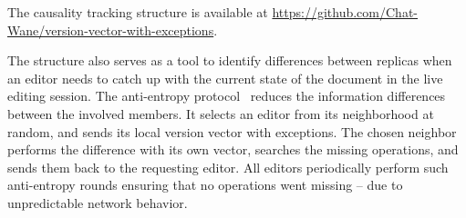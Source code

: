 The causality tracking structure is available at
\url{https://github.com/Chat-Wane/version-vector-with-exceptions}.

The structure also serves as a tool to identify differences between replicas
when an editor needs to catch up with the current state of the document in the
live editing session. The anti-entropy protocol~\cite{demers1987epidemic}
reduces the information differences between the involved members. It selects an
editor from its neighborhood at random, and sends its local version vector with
exceptions. The chosen neighbor performs the difference with its own vector,
searches the missing operations, and sends them back to the requesting
editor. All editors periodically perform such anti-entropy rounds ensuring that
no operations went missing -- due to unpredictable network behavior.





